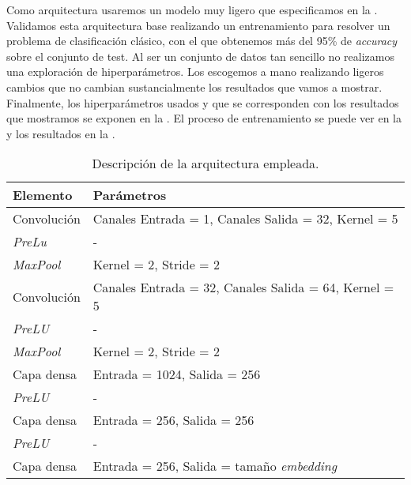Como arquitectura usaremos un modelo muy ligero que especificamos en la . Validamos esta arquitectura base realizando un entrenamiento para resolver un problema de clasificación clásico, con el que obtenemos más del 95\% de \textit{accuracy} sobre el conjunto de test. Al ser un conjunto de datos tan sencillo no realizamos una exploración de hiperparámetros. Los escogemos a mano realizando ligeros cambios que no cambian sustancialmente los resultados que vamos a mostrar. Finalmente, los hiperparámetros usados y que se corresponden con los resultados que mostramos se exponen en la . El proceso de entrenamiento se puede ver en la  y los resultados en la .

\begin{table}[H]
\centering
\begin{tabular}{|l|l|}
    \hline
    Elemento & Parámetros \\
    \hline
    Convolución & Canales Entrada = 1, Canales Salida = 32, Kernel = 5 \\
    \textit{PreLu} & - \\
    \textit{MaxPool} & Kernel = 2, Stride = 2 \\
    Convolución & Canales Entrada = 32, Canales Salida = 64, Kernel = 5 \\
    \textit{PreLU} & - \\
    \textit{MaxPool} & Kernel = 2, Stride = 2 \\
    Capa densa & Entrada = 1024, Salida = 256 \\
    \textit{PreLU} & - \\
    Capa densa & Entrada = 256, Salida = 256 \\
    \textit{PreLU} & - \\
    Capa densa & Entrada = 256, Salida = tamaño \textit{embedding} \\
    \hline
\end{tabular}
\caption{Descripción de la arquitectura empleada.}
\label{table:arquitectura_mnist}
\end{table}

